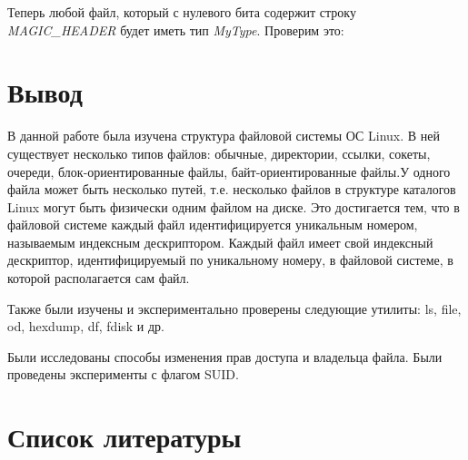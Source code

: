 \documentclass[14pt,a4paper,report]{report}
\begin{document}
Теперь любой файл, который с нулевого бита содержит строку \emph{MAGIC\_HEADER} будет иметь тип \emph{MyType}. Проверим это:



\section{Вывод}

В данной работе была изучена структура файловой системы ОС Linux. В ней существует несколько типов файлов: обычные, директории, ссылки, сокеты, очереди, блок-ориентированные файлы, байт-ориентированные файлы.У одного файла может быть несколько путей, т.е. несколько файлов в структуре каталогов Linux могут быть физически одним файлом на диске. Это достигается тем, что в файловой системе каждый файл идентифицируется уникальным номером, называемым индексным дескриптором. Каждый файл имеет свой индексный дескриптор, идентифицируемый по уникальному номеру, в файловой системе, в которой располагается сам файл.

Также были изучены и экспериментально проверены следующие утилиты: ls, file, od, hexdump, df, fdisk и др.

Были исследованы способы изменения прав доступа и владельца файла. Были проведены эксперименты с флагом SUID.

\clearpage

\section{Список литературы}
\end{document}
